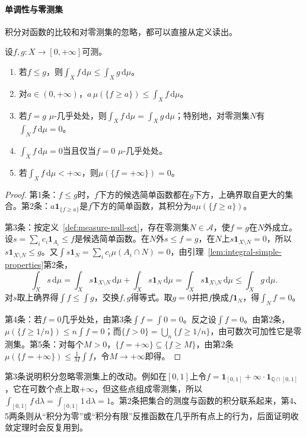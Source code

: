 \paragraph{单调性与零测集}
积分对函数的比较和对零测集的忽略，都可以直接从定义读出。

\begin{lemma}[非负积分的基本性质]
\label{lem:integral-nonnegative-basic}
设$f,g:X\to[0,+\infty]$可测。
\begin{enumerate}
 \item 若$f\le g$，则$\int_Xf\,\mathrm d\mu\le\int_Xg\,\mathrm d\mu$。
 \item 对$a\in(0,+\infty)$，$a\,\mu(\{f\ge a\})\le\int_Xf\,\mathrm d\mu$。
 \item 若$f=g$ $\mu$-几乎处处，则$\int_Xf\,\mathrm d\mu=\int_Xg\,\mathrm d\mu$；特别地，对零测集$N$有$\int_Nf\,\mathrm d\mu=0$。
 \item $\int_Xf\,\mathrm d\mu=0$当且仅当$f=0$ $\mu$-几乎处处。
 \item 若$\int_Xf\,\mathrm d\mu<+\infty$，则$\mu(\{f=+\infty\})=0$。
\end{enumerate}
\end{lemma}

\begin{proof}
第1条：$f\le g$时，$f$下方的候选简单函数都在$g$下方，上确界取自更大的集合。第2条：$a\mathbf 1_{\{f\ge a\}}$是$f$下方的简单函数，其积分为$a\mu(\{f\ge a\})$。

第3条：按定义~\ref{def:measure-null-set}，存在零测集$N\in\mathcal A$，使$f=g$在$N$外成立。设$s=\sum_ic_i\mathbf 1_{A_i}\le f$是候选简单函数。在$N$外$s\le f=g$，在$N$上$s\mathbf 1_{X\setminus N}=0$，所以$s\mathbf 1_{X\setminus N}\le g$。又$\int s\mathbf 1_N=\sum_ic_i\mu(A_i\cap N)=0$，由引理~\ref{lem:integral-simple-properties}第2条，
\[
 \int_Xs\,\mathrm d\mu=\int_Xs\mathbf 1_{X\setminus N}\,\mathrm d\mu+\int_Xs\mathbf 1_N\,\mathrm d\mu=\int_Xs\mathbf 1_{X\setminus N}\,\mathrm d\mu\le\int_Xg\,\mathrm d\mu.
\]
对$s$取上确界得$\int f\le\int g$，交换$f,g$得等式。取$g=0$并把$f$换成$f\mathbf 1_N$，得$\int_Nf=0$。

第4条：若$f=0$几乎处处，由第3条$\int f=\int0=0$。反之设$\int f=0$。由第2条，$\mu(\{f\ge1/n\})\le n\int f=0$；而$\{f>0\}=\bigcup_n\{f\ge1/n\}$，由可数次可加性它是零测集。第5条：对每个$M>0$，$\{f=+\infty\}\subseteq\{f\ge M\}$，由第2条$\mu(\{f=+\infty\})\le\frac1M\int f$，令$M\to+\infty$即得。
\end{proof}

第3条说明积分忽略零测集上的改动。例如在$[0,1]$上令$f=\mathbf 1_{[0,1]}+\infty\cdot\mathbf 1_{\mathbb Q\cap[0,1]}$，它在可数个点上取$+\infty$，但这些点组成零测集，所以$\int_{[0,1]}f\,\mathrm d\lambda=\int_{[0,1]}1\,\mathrm d\lambda=1$。第2条把集合的测度与函数的积分联系起来，第4、5两条则从“积分为零”或“积分有限”反推函数在几乎所有点上的行为，后面证明收敛定理时会反复用到。

